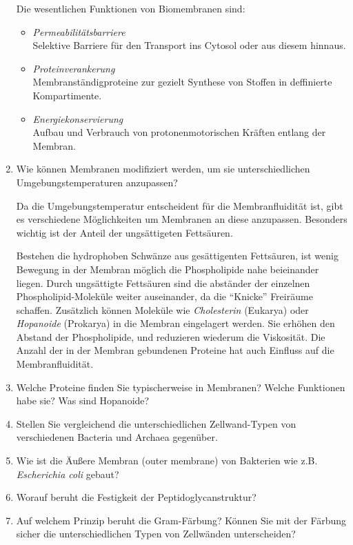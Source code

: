 \begin{enumerate}
			Die wesentlichen Funktionen von Biomembranen sind:

			\begin{itemize}
				\item \emph{Permeabilitätsbarriere} \hfill \\
				Selektive Barriere für den Transport ins Cytosol oder aus diesem hinnaus.
				\item\emph{Proteinverankerung} \hfill \\
				Membranständigproteine zur gezielt Synthese von Stoffen in deffinierte Kompartimente.
				\item\emph{Energiekonservierung} \hfill \\
				Aufbau und Verbrauch von protonenmotorischen Kräften entlang der Membran.
			\end{itemize}

		\item Wie können Membranen modifiziert werden, um sie unterschiedlichen Umgebungstemperaturen anzupassen?
			
			Da die Umgebungstemperatur entscheident für die Membranfluidität ist,
			gibt es verschiedene Möglichkeiten um Membranen an diese anzupassen.
			Besonders wichtig ist der Anteil der ungsättigeten Fettsäuren.

			Bestehen die hydrophoben Schwänze aus gesättigenten Fettsäuren,
			ist wenig Bewegung in der Membran möglich die Phospholipide nahe beieinander liegen.
			Durch ungsättigte Fettsäuren sind die abständer der einzelnen Phospholipid-Moleküle weiter auseinander,
			da die ``Knicke'' Freiräume schaffen.
			Zusätzlich können Moleküle wie \emph{Cholesterin} (Eukarya) oder \emph{Hopanoide} (Prokarya) in die Membran eingelagert werden.
			Sie erhöhen den Abstand der Phospholipide,
			und reduzieren wiederum die Viskosität. %
			Die Anzahl der in der Membran gebundenen Proteine hat auch Einfluss auf die Membranfluidität.


		\item Welche Proteine finden Sie typischerweise in Membranen? Welche Funktionen habe sie? Was sind Hopanoide?
		\item Stellen Sie vergleichend die unterschiedlichen Zellwand-Typen von verschiedenen Bacteria und Archaea gegenüber.
		\item Wie ist die Äußere Membran (outer membrane) von Bakterien wie z.B. \emph{Escherichia coli} gebaut?
		\item Worauf beruht die Festigkeit der Peptidoglycanstruktur? 
		\item Auf welchem Prinzip beruht die Gram-Färbung? Können Sie mit der Färbung sicher die unterschiedlichen Typen von Zellwänden unterscheiden?
	\end{enumerate}

